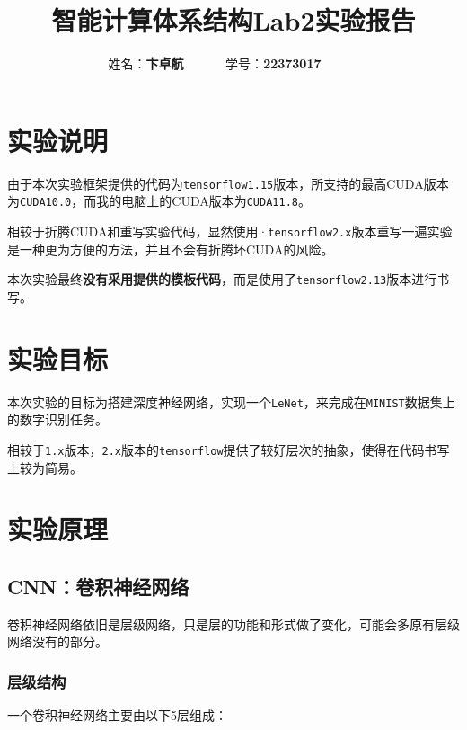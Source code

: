\documentclass[12pt,a4paper]{article}
\begin{document}
\title{智能计算体系结构Lab2实验报告}
\date{}

\author{
姓名：\textbf{卞卓航}~~~~~~
学号：\textbf{22373017}~~~~~~
}

\maketitle

\section{实验说明}

由于本次实验框架提供的代码为\texttt{tensorflow1.15}版本，所支持的最高CUDA版本为\texttt{CUDA10.0}，而我的电脑上的CUDA版本为\texttt{CUDA11.8}。

相较于折腾CUDA和重写实验代码，显然使用·\texttt{tensorflow2.x}版本重写一遍实验是一种更为方便的方法，并且不会有折腾坏CUDA的风险。

本次实验最终\textbf{没有采用提供的模板代码}，而是使用了\texttt{tensorflow2.13}版本进行书写。

\section{实验目标}

本次实验的目标为搭建深度神经网络，实现一个\texttt{LeNet}，来完成在\texttt{MINIST}数据集上的数字识别任务。

相较于\texttt{1.x}版本，\texttt{2.x}版本的\texttt{tensorflow}提供了较好层次的抽象，使得在代码书写上较为简易。

\section{实验原理}

\subsection{CNN：卷积神经网络}

卷积神经网络依旧是层级网络，只是层的功能和形式做了变化，可能会多原有层级网络没有的部分。

\subsubsection{层级结构}

一个卷积神经网络主要由以下5层组成：
\end{document}
